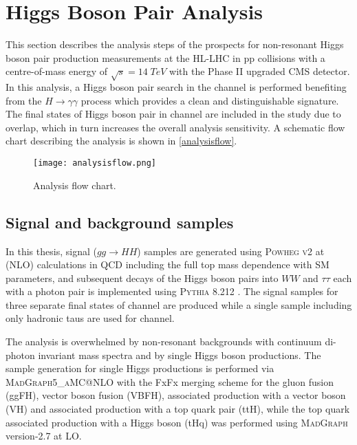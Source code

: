 {\section{Higgs Boson Pair Analysis}

This section describes the analysis steps of the prospects for non-resonant Higgs boson pair production measurements at the HL-LHC in pp collisions with a centre-of-mass energy of $\sqrt{s}=14\;TeV$ with the Phase II upgraded CMS detector. In this analysis, a Higgs boson pair search in the \wwgg channel is performed benefiting from the $H\rightarrow\gamma\gamma$ process which provides a clean and distinguishable signature. The final states of Higgs boson pair in \wwgg channel are included in the study due to overlap, which in turn increases the overall analysis sensitivity. A schematic flow chart describing the analysis is shown in \autoref{analysisflow}.

\begin{figure}[ht]
	\centering
	\texttt{[image: analysisflow.png]}
	\vspace{2mm}
	\caption{Analysis flow chart.}
	\label{analysisflow}
\end{figure}

\subsection{Signal and background samples}\label{samples_section}

In this thesis, signal ($gg \rightarrow HH$) samples are generated using \textsc{Powheg v2} \cite{Nason2004, Frixione2007, Alioli2010, Heinrich2019} at (NLO) calculations in QCD including the full top mass dependence with SM parameters, and subsequent decays of the Higgs boson pairs into $WW$ and $\tau\tau$ each with a photon pair is implemented using \textsc{Pythia 8.212} \cite{Sjstrand2015}. The signal samples for three separate final states of \wwgg channel are produced while a single sample including only hadronic taus are used for \ttgg channel.

The analysis is overwhelmed by non-resonant backgrounds with continuum di-photon invariant mass \mgg spectra and by single Higgs boson productions. The sample generation for single Higgs productions is performed via \textsc{MadGraph5\_aMC@NLO} \cite{Alwall2014, Artoisenet2013} with the FxFx merging scheme \cite{Frederix2012} for the gluon fusion (ggFH), vector boson fusion (VBFH), associated production with a vector boson (VH) and associated production with a top quark pair (ttH), while the top quark associated production  with a Higgs boson (tHq) was performed using \textsc{MadGraph} version-2.7 at LO.

}
